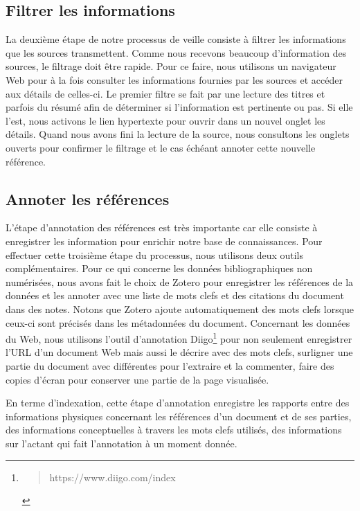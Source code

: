 \documentclass[
  letterpaper,
  DIV=11,
  numbers=noendperiod]{scrreprt}
\begin{document}
\hypertarget{sec-filtrerInfos}{%
\subsection{Filtrer les informations}\label{sec-filtrerInfos}}

La deuxième étape de notre processus de veille consiste à filtrer les
informations que les sources transmettent. Comme nous recevons beaucoup
d'information des sources, le filtrage doit être rapide. Pour ce faire,
nous utilisons un navigateur Web pour à la fois consulter les
informations fournies par les sources et accéder aux détails de
celles-ci. Le premier filtre se fait par une lecture des titres et
parfois du résumé afin de déterminer si l'information est pertinente ou
pas. Si elle l'est, nous activons le lien hypertexte pour ouvrir dans un
nouvel onglet les détails. Quand nous avons fini la lecture de la
source, nous consultons les onglets ouverts pour confirmer le filtrage
et le cas échéant annoter cette nouvelle référence.

\hypertarget{sec-annoterReference}{%
\subsection{Annoter les références}\label{sec-annoterReference}}

L'étape d'annotation des références est très importante car elle
consiste à enregistrer les information pour enrichir notre base de
connaissances. Pour effectuer cette troisième étape du processus, nous
utilisons deux outils complémentaires. Pour ce qui concerne les données
bibliographiques non numérisées, nous avons fait le choix de Zotero pour
enregistrer les références de la données et les annoter avec une liste
de mots clefs et des citations du document dans des notes. Notons que
Zotero ajoute automatiquement des mots clefs lorsque ceux-ci sont
précisés dans les métadonnées du document. Concernant les données du
Web, nous utilisons l'outil d'annotation Diigo\footnote{\begin{quote}
  https://www.diigo.com/index
  \end{quote}} pour non seulement enregistrer l'URL d'un document Web
mais aussi le décrire avec des mots clefs, surligner une partie du
document avec différentes pour l'extraire et la commenter, faire des
copies d'écran pour conserver une partie de la page visualisée.

En terme d'indexation, cette étape d'annotation enregistre les rapports
entre des informations physiques concernant les références d'un document
et de ses parties, des informations conceptuelles à travers les mots
clefs utilisés, des informations sur l'actant qui fait l'annotation à un
moment donnée.
\end{document}
